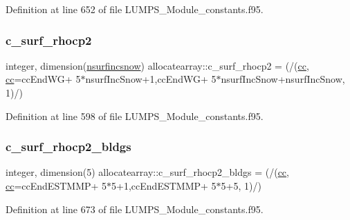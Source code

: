 Definition at line 652 of file L\+U\+M\+P\+S\+\_\+\+Module\+\_\+constants.\+f95.

\mbox{\label{namespaceallocatearray_a11520098b1a1428ee68c6a7a1b292b53}} 
\subsubsection{\texorpdfstring{c\+\_\+surf\+\_\+rhocp2}{c\_surf\_rhocp2}}
{\footnotesize\ttfamily integer, dimension(\hyperlink{namespaceallocatearray_af4d113f332b6759cfa22271140c9162d}{nsurfincsnow}) allocatearray\+::c\+\_\+surf\+\_\+rhocp2 = (/(\hyperlink{namespaceallocatearray_ac863c81704eb507dee10f5e10741e10c}{cc}, \hyperlink{namespaceallocatearray_ac863c81704eb507dee10f5e10741e10c}{cc}=cc\+End\+WG+ 5$\ast$nsurf\+Inc\+Snow+1,cc\+End\+WG+ 5$\ast$nsurf\+Inc\+Snow+nsurf\+Inc\+Snow, 1)/)}



Definition at line 598 of file L\+U\+M\+P\+S\+\_\+\+Module\+\_\+constants.\+f95.

\mbox{\label{namespaceallocatearray_a2f5bad25e3bd8e03f5a04b8227c01703}} 
\subsubsection{\texorpdfstring{c\+\_\+surf\+\_\+rhocp2\+\_\+bldgs}{c\_surf\_rhocp2\_bldgs}}
{\footnotesize\ttfamily integer, dimension(5) allocatearray\+::c\+\_\+surf\+\_\+rhocp2\+\_\+bldgs = (/(\hyperlink{namespaceallocatearray_ac863c81704eb507dee10f5e10741e10c}{cc}, \hyperlink{namespaceallocatearray_ac863c81704eb507dee10f5e10741e10c}{cc}=cc\+End\+E\+S\+T\+M\+MP+ 5$\ast$5+1,cc\+End\+E\+S\+T\+M\+MP+ 5$\ast$5+5, 1)/)}



Definition at line 673 of file L\+U\+M\+P\+S\+\_\+\+Module\+\_\+constants.\+f95.

\mbox{\label{namespaceallocatearray_a20107aaba9ae2f761b47e50002d54c19}} 
